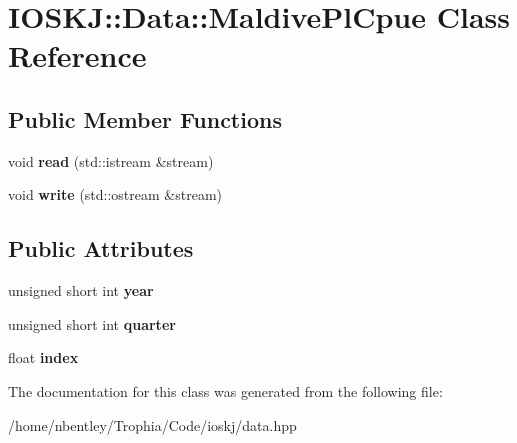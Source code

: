 \hypertarget{classIOSKJ_1_1Data_1_1MaldivePlCpue}{\section{I\-O\-S\-K\-J\-:\-:Data\-:\-:Maldive\-Pl\-Cpue Class Reference}
\label{classIOSKJ_1_1Data_1_1MaldivePlCpue}
}
\subsection*{Public Member Functions}
\begin{DoxyCompactItemize}
\item 
\hypertarget{classIOSKJ_1_1Data_1_1MaldivePlCpue_a70c9b6be419fdb294f308ea5daa86aa9}{void {\bfseries read} (std\-::istream \&stream)}\label{classIOSKJ_1_1Data_1_1MaldivePlCpue_a70c9b6be419fdb294f308ea5daa86aa9}

\item 
\hypertarget{classIOSKJ_1_1Data_1_1MaldivePlCpue_a5cc13990332eef94093c2b0d4c4ac150}{void {\bfseries write} (std\-::ostream \&stream)}\label{classIOSKJ_1_1Data_1_1MaldivePlCpue_a5cc13990332eef94093c2b0d4c4ac150}

\end{DoxyCompactItemize}
\subsection*{Public Attributes}
\begin{DoxyCompactItemize}
\item 
\hypertarget{classIOSKJ_1_1Data_1_1MaldivePlCpue_a74f457be89bb489478b9361f716e52ba}{unsigned short int {\bfseries year}}\label{classIOSKJ_1_1Data_1_1MaldivePlCpue_a74f457be89bb489478b9361f716e52ba}

\item 
\hypertarget{classIOSKJ_1_1Data_1_1MaldivePlCpue_a0a933e24599d452dd116855374876bc9}{unsigned short int {\bfseries quarter}}\label{classIOSKJ_1_1Data_1_1MaldivePlCpue_a0a933e24599d452dd116855374876bc9}

\item 
\hypertarget{classIOSKJ_1_1Data_1_1MaldivePlCpue_a217bc0b50e0910ead7e0db2cbb26dc30}{float {\bfseries index}}\label{classIOSKJ_1_1Data_1_1MaldivePlCpue_a217bc0b50e0910ead7e0db2cbb26dc30}

\end{DoxyCompactItemize}


The documentation for this class was generated from the following file\-:\begin{DoxyCompactItemize}
\item 
/home/nbentley/\-Trophia/\-Code/ioskj/data.\-hpp\end{DoxyCompactItemize}
